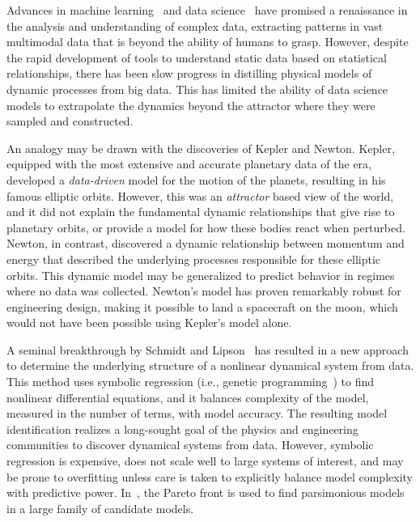 \documentclass[onecolumn,11pt]{article}
\begin{document}
Advances in machine learning~\cite{Jordan2015science} and data science~\cite{Marx2013nature,Khoury2014science} have promised a renaissance in the analysis and understanding of complex data, extracting patterns in vast multimodal data that is beyond the ability of humans to grasp.  
However, despite the rapid development of tools to understand static data based on statistical relationships, there has been slow progress in distilling physical models of dynamic processes from big data.  
This has limited the ability of data science models to extrapolate the dynamics beyond the attractor where they were sampled and constructed.

An analogy may be drawn with the discoveries of Kepler and Newton.  
Kepler, equipped with the most extensive and accurate planetary data of the era, developed a \emph{data-driven} model for the motion of the planets, resulting in his famous elliptic orbits.
However, this was an \emph{attractor} based view of the world, and it did not explain the fundamental dynamic relationships that give rise to planetary orbits, or provide a model for how these bodies react when perturbed.  
Newton, in contrast, discovered a dynamic relationship between momentum and energy that described the underlying processes responsible for these elliptic orbits.  
This {dynamic} model may be generalized to predict behavior in regimes where no data was collected.  Newton's model has proven remarkably robust for engineering design, making it possible to land a spacecraft on the moon, which would not have been possible using Kepler's model alone. 

A seminal breakthrough by Schmidt and Lipson~\cite{Bongard2007pnas,Schmidt2009science} has resulted in a new approach to determine the underlying structure of a nonlinear dynamical system from data.  
This method uses symbolic regression (i.e., genetic programming~\cite{koza1992genetic}) to find nonlinear differential equations, and it balances complexity of the model, measured in the number of terms, with model accuracy.
The resulting {model identification} realizes a long-sought goal of the physics and engineering communities to discover dynamical systems from data. 
However, symbolic regression is expensive, does not scale well to large systems of interest, and may be prone to overfitting unless care is taken to explicitly balance model complexity with predictive power.  
In~\cite{Schmidt2009science}, the Pareto front is used to find parsimonious models in a large family of candidate models.  
\end{document}
